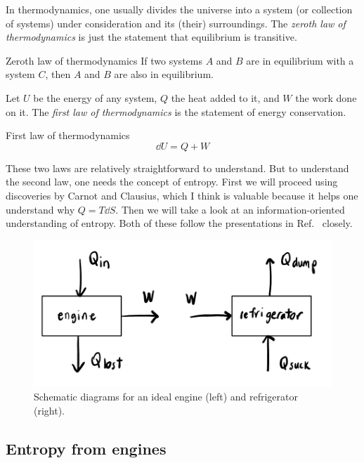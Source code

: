 In thermodynamics, one usually divides the universe into a system 
(or collection of systems) under
consideration and its (their) surroundings.
The {\it zeroth law of thermodynamics} is just the statement that
equilibrium is transitive.
\begin{theorem}{Zeroth law of thermodynamics}{}
  If two systems $A$ and $B$ are in equilibrium with a system $C$, then
$A$ and $B$ are also in equilibrium.
\end{theorem}
Let $U$ be the energy of any system,
$Q$ the heat added to it, and
$W$ the work done on it. The {\it first law of thermodynamics}
is the statement of energy conservation.
\begin{theorem}{First law of thermodynamics}{}
  $$\dd U=Q+W$$
\end{theorem}

These two laws are relatively straightforward to understand. But to understand
the second law, one needs the concept of entropy. First we will proceed
using discoveries by Carnot and Clausius, which I think is valuable
because it helps one understand why $Q=T\dd S$. Then we will take a look at an
information-oriented understanding of entropy. Both of these follow the
presentations in Ref.~\cite{kardar_statistical_2007} closely.



\begin{figure}
\includegraphics[width=\linewidth]{figs/engineFrige.pdf}
\caption{Schematic diagrams for an ideal engine (left) and refrigerator (right).}
\label{fig:engineFrige}
\end{figure}



\subsection{Entropy from engines}

